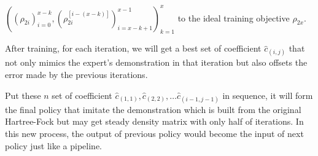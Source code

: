 \documentclass[twoside]{article}
\begin{document}
$((\rho_{2i})_{i=0}^{x-k} ,(\rho_{2i}^{[i-(x-k)]})^{x-1}_{i=x-k+1})_{k=1}^{x}$  
to the ideal training objective $\rho_{2x}$.
%

After training, for each iteration, we will get a best set of coefficient $\hat{c}_{(i,j)}$ that not only mimics the expert's demonstration in that iteration but also offsets the error made by the previous iterations.

% 
Put these $n$ set of coefficient $\hat{c}_{(1,1)}, \hat{c}_{(2,2)}, \ldots  \hat{c}_{(i-1,j-1)}$ in sequence, it will form the final policy that imitate the demonstration which is built from  the original Hartree-Fock but may get steady density matrix with only half of iterations. In this new process, the output of previous policy would become the input of next policy just like a pipeline. 


\end{document}

